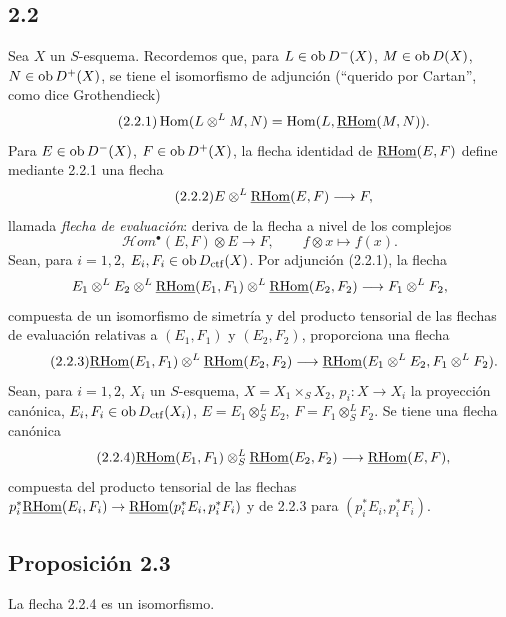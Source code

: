 \subsection*{2.2}
Sea $X$ un $S$-esquema. Recordemos que, para $L\in\operatorname{ob} D^{-}(X)$, $M\in\operatorname{ob} D(X)$, $N\in\operatorname{ob} D^{+}(X)$, se tiene el isomorfismo de adjunción (``querido por Cartan'', como dice Grothendieck)
\begin{equation}\tag{2.2.1}
\operatorname{Hom}(L\otimes^{L}M,N)=\operatorname{Hom}(L,\underline{\mathrm{RHom}}(M,N)).
\end{equation}
Para $E\in\operatorname{ob} D^{-}(X)$, $F\in\operatorname{ob} D^{+}(X)$, la flecha identidad de $\underline{\mathrm{RHom}}(E,F)$ define mediante 2.2.1 una flecha
\begin{equation}\tag{2.2.2}
E\otimes^{L}\underline{\mathrm{RHom}}(E,F)\longrightarrow F,
\end{equation}
llamada \emph{flecha de evaluación}: deriva de la flecha a nivel de los complejos
\[
\mathcal Hom^{\bullet}(E,F)\otimes E\longrightarrow F,
\qquad f\otimes x\longmapsto f(x).
\]
Sean, para $i=1,2$, $E_i,F_i\in\operatorname{ob} D_{\mathrm{ctf}}(X)$. Por adjunción (2.2.1), la flecha
\[
E_1\otimes^{L}E_2\otimes^{L}\underline{\mathrm{RHom}}(E_1,F_1)\otimes^{L}\underline{\mathrm{RHom}}(E_2,F_2)\longrightarrow F_1\otimes^{L}F_2,
\]
compuesta de un isomorfismo de simetría y del producto tensorial de las flechas de evaluación relativas a $(E_1,F_1)$ y $(E_2,F_2)$, proporciona una flecha
\begin{equation}\tag{2.2.3}
\underline{\mathrm{RHom}}(E_1,F_1)\otimes^{L}\underline{\mathrm{RHom}}(E_2,F_2)\longrightarrow\underline{\mathrm{RHom}}(E_1\otimes^{L}E_2,F_1\otimes^{L}F_2).
\end{equation}
Sean, para $i=1,2$, $X_i$ un $S$-esquema, $X=X_1\times_SX_2$, $p_i:X\to X_i$ la proyección canónica, $E_i,F_i\in\operatorname{ob} D_{\mathrm{ctf}}(X_i)$, $E=E_1\otimes^{L}_{S}E_2$, $F=F_1\otimes^{L}_{S}F_2$. Se tiene una flecha canónica
\begin{equation}\tag{2.2.4}
\underline{\mathrm{RHom}}(E_1,F_1)\otimes^{L}_{S}\underline{\mathrm{RHom}}(E_2,F_2)\longrightarrow\underline{\mathrm{RHom}}(E,F),
\end{equation}
compuesta del producto tensorial de las flechas $p_i^{*}\underline{\mathrm{RHom}}(E_i,F_i)\to\underline{\mathrm{RHom}}(p_i^{*}E_i,p_i^{*}F_i)$ y de 2.2.3 para $(p_i^{*}E_i,p_i^{*}F_i)$.

\subsection*{Proposición 2.3}
La flecha 2.2.4 es un isomorfismo.

